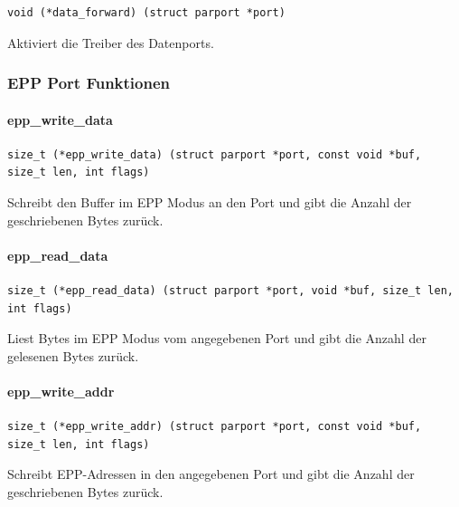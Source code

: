 \documentclass[a4paper,11pt]{article}
\begin{document}
\begin{verbatim}
void (*data_forward) (struct parport *port)
\end{verbatim}

Aktiviert die Treiber des Datenports.





\subsubsection{EPP Port Funktionen}

\paragraph{epp\_write\_data}
\begin{verbatim}
size_t (*epp_write_data) (struct parport *port, const void *buf, size_t len, int flags)
\end{verbatim}

Schreibt den Buffer im EPP Modus an den Port und gibt die Anzahl der geschriebenen Bytes zurück.

\paragraph{epp\_read\_data}
\begin{verbatim}
size_t (*epp_read_data) (struct parport *port, void *buf, size_t len, int flags)
\end{verbatim}
Liest Bytes im EPP Modus vom angegebenen Port und gibt die Anzahl der gelesenen Bytes zurück.

\paragraph{epp\_write\_addr}
\begin{verbatim}
size_t (*epp_write_addr) (struct parport *port, const void *buf, size_t len, int flags)
\end{verbatim}
Schreibt EPP-Adressen in den angegebenen Port und gibt die Anzahl der geschriebenen Bytes zurück.
\end{document}
